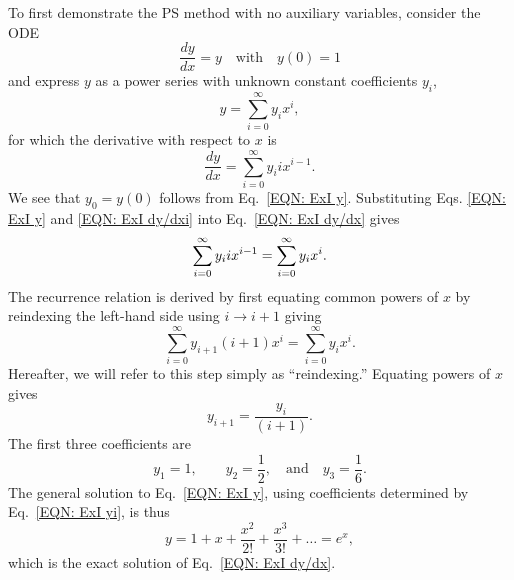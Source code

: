 \documentclass{article}
\begin{document}
To first demonstrate the PS method with no auxiliary variables, consider the ODE
    \begin{equation}\label{EQN: ExI dy/dx}
        \frac{dy}{dx}=y\quad\mbox{with}\quad y(0) =1
    \end{equation}
and express $y$ as a power series with unknown constant coefficients $y_i$,
    \begin{equation}\label{EQN: ExI y}
            y=\sum_{i=0}^\infty y_ix^i,
    \end{equation}
for which the derivative with respect to $x$ is
    \begin{equation}\label{EQN: ExI dy/dxi}
        \frac{dy}{dx}=\sum_{i=0}^\infty y_iix^{i-1}.
    \end{equation}
We see that $y_0=y(0)$ follows from Eq.~\eqref{EQN: ExI y}. Substituting Eqs. \eqref{EQN: ExI y} and \eqref{EQN: ExI dy/dxi} into Eq.~\eqref{EQN: ExI dy/dx} gives
    \begin{equation*}
            \sum_{i=0}^\infty y_iix^{i-1}=\sum_{i=0}^\infty y_ix^i.\\
    \end{equation*}
The recurrence relation is derived by first equating common powers of $x$ by reindexing the left-hand side using $i \to i+1$ giving
    \begin{equation*}
        \sum_{i=0}^\infty y_{i+1}(i+1)x^{i}=\sum_{i=0}^\infty y_ix^i.
    \end{equation*}
Hereafter, we will refer to this step simply as ``reindexing.''  Equating powers of $x$ gives
    \begin{equation}\label{EQN: ExI yi}
        y_{i+1} = \frac{y_i}{(i+1)}.
    \end{equation}
The first three coefficients are
    \begin{equation*}
        y_1=1,\quad\quad y_2=\frac{1}{2},\quad\mbox{and}\quad y_3=\frac{1}{6}.
    \end{equation*}
The general solution to Eq.~\eqref{EQN: ExI y}, using coefficients determined by Eq.~\eqref{EQN: ExI yi}, is thus
    \begin{equation*}
        y=1+x+\frac{x^2}{2!}+\frac{x^3}{3!}+\dots=e^x,
    \end{equation*}
which is the exact solution of Eq.~\eqref{EQN: ExI dy/dx}.
\end{document}
